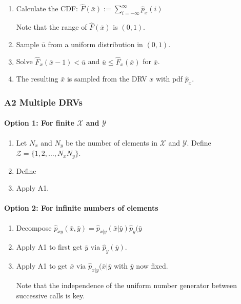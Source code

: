 \documentclass[10pt,a4paper]{scrartcl}
\begin{document}
\begin{multicols*}{2}
\begin{multicols*}{3}
\begin{enumerate}
\item Calculate the CDF: $\hat{F}(\bar{x}):=\sum\limits_{i=-\infty}^\infty \hat{p}_x(i)$

Note that the range of $\hat{F}(\bar{x})$ is $(0,1)$.
\item Sample $\bar{u}$ from a uniform distribution in $(0,1)$.
\item Solve $\hat{F}_x(\bar{x}-1)<\bar{u}$ and $\bar{u}\leq \hat{F}_x(\bar{x})$ for $\bar{x}$.
\item The resulting $\bar{x}$ is sampled from the DRV $x$ with pdf $\hat{p}_x$.
\end{enumerate}


\subsubsection{A2 Multiple DRVs}

\paragraph{Option 1: For finite $\mathcal{X}$ and $\mathcal{Y}$}

\begin{enumerate}
\item Let $N_x$ and $N_y$ be the number of elements in $\mathcal{X}$ and $\mathcal{Y}$. Define $\mathcal{Z}=\{1,2,\ldots,N_xN_y\}$.
\item Define
\item Apply A1.
\end{enumerate}

\paragraph{Option 2: For infinite numbers of elements}

\begin{enumerate}
\item Decompose $\hat{p}_{xy}(\bar{x},\bar{y})=\hat{p}_{x|y}(\bar{x}|\bar{y})\hat{p}_y(\bar{y}$
\item Apply A1 to first get $\bar{y}$ via $\hat{p}_y(\bar{y})$.
\item Apply A1 to get $\bar{x}$ via $\hat{p}_{x|y}(\bar{x}|\bar{y}$ with $\bar{y}$ now fixed.

Note that the independence of the uniform number generator between successive calls is key.
\end{enumerate}


\end{multicols*}
\end{multicols*}
\end{document}
